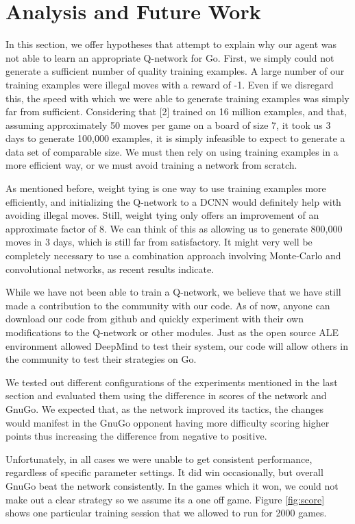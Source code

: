 \section{Analysis and Future Work}
In this section, we offer hypotheses that attempt to explain why our agent was not able to learn an appropriate Q-network for Go. First, we simply could not generate a sufficient number of quality training examples. A large number of our training examples were illegal moves with a reward of -1. Even if we disregard this, the speed with which we were able to generate training examples was simply far from sufficient. Considering that [2] trained on 16 million examples, and that, assuming approximately 50 moves per game on a board of size 7, it took us 3 days to generate 100,000 examples, it is simply infeasible to expect to generate a data set of comparable size. We must then rely on using training examples in a more efficient way, or we must avoid training a network from scratch.

As mentioned before, weight tying is one way to use training examples more efficiently, and initializing the Q-network to a DCNN would definitely help with avoiding illegal moves. Still, weight tying only offers an improvement of an approximate factor of 8. We can think of this as allowing us to generate 800,000 moves in 3 days, which is still far from satisfactory. It might very well be completely necessary to use a combination approach involving Monte-Carlo and convolutional networks, as recent results indicate. 

While we have not been able to train a Q-network, we believe that we have still made a contribution to the community with our code. As of now, anyone can download our code from github and quickly experiment with their own modifications to the Q-network or other modules. Just as the open source ALE environment allowed DeepMind to test their system, our code will allow others in the community to test their strategies on Go.

We tested out different configurations of the experiments mentioned in the last section and evaluated them using the difference in scores of the network and GnuGo. We expected that, as the network improved its tactics, the changes would manifest in the GnuGo opponent having more difficulty scoring higher points thus increasing the difference from negative to positive.

Unfortunately, in all cases we were unable to get consistent performance, regardless of specific parameter settings. It did win occasionally, but overall GnuGo beat the network consistently. In the games which it won, we could not make out a clear strategy so we assume its a one off game. Figure \ref{fig:score} shows one particular training session that we allowed to run for 2000 games. 